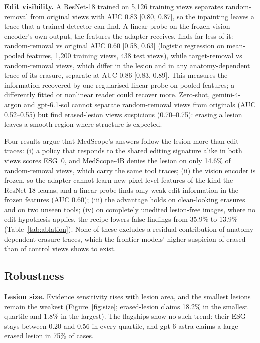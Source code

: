 \documentclass[11pt]{article}
\begin{document}
\textbf{Edit visibility.} A ResNet-18 trained on 5,126 training views separates random-removal from original views with AUC 0.83 [0.80, 0.87], so the inpainting leaves a trace that a trained detector can find. A linear probe on the frozen vision encoder's own output, the features the adapter receives, finds far less of it: random-removal vs original AUC 0.60 [0.58, 0.63] (logistic regression on mean-pooled features, 1,200 training views, 438 test views), while target-removal vs random-removal views, which differ in the lesion and in any anatomy-dependent trace of its erasure, separate at AUC 0.86 [0.83, 0.89]. This measures the information recovered by one regularised linear probe on pooled features; a differently fitted or nonlinear reader could recover more. Zero-shot, gemini-4-argon and gpt-6.1-sol cannot separate random-removal views from originals (AUC 0.52--0.55) but find erased-lesion views suspicious (0.70--0.75): erasing a lesion leaves a smooth region where structure is expected.

Four results argue that MedScope's answers follow the lesion more than edit traces: (i) a policy that responds to the shared editing signature alike in both views scores ESG~0, and MedScope-4B denies the lesion on only 14.6\% of random-removal views, which carry the same tool traces; (ii) the vision encoder is frozen, so the adapter cannot learn new pixel-level features of the kind the ResNet-18 learns, and a linear probe finds only weak edit information in the frozen features (AUC 0.60); (iii) the advantage holds on clean-looking erasures and on two unseen tools; (iv) on completely unedited lesion-free images, where no edit hypothesis applies, the recipe lowers false findings from 35.9\% to 13.9\% (Table~\ref{tab:ablation}). None of these excludes a residual contribution of anatomy-dependent erasure traces, which the frontier models' higher suspicion of erased than of control views shows to exist.

\subsection{Robustness}\label{sec:robust}
\textbf{Lesion size.} Evidence sensitivity rises with lesion area, and the smallest lesions remain the weakest (Figure~\ref{fig:size}; erased-lesion claims 18.2\% in the smallest quartile and 1.8\% in the largest). The flagships show no such trend: their ESG stays between 0.20 and 0.56 in every quartile, and gpt-6-astra claims a large erased lesion in 75\% of cases.
\end{document}
